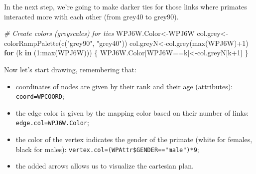 \documentclass[
  notitlepage,
  onecolumn,
  openany]{book}
\newenvironment{Shaded}{\begin{snugshade}}{\end{snugshade}}
\newcommand{\CommentTok}[1]{\textcolor[rgb]{0.56,0.35,0.01}{\textit{#1}}}
\newcommand{\ControlFlowTok}[1]{\textcolor[rgb]{0.13,0.29,0.53}{\textbf{#1}}}
\newcommand{\DecValTok}[1]{\textcolor[rgb]{0.00,0.00,0.81}{#1}}
\newcommand{\FunctionTok}[1]{\textcolor[rgb]{0.00,0.00,0.00}{#1}}
\newcommand{\NormalTok}[1]{#1}
\newcommand{\OtherTok}[1]{\textcolor[rgb]{0.56,0.35,0.01}{#1}}
\newcommand{\SpecialCharTok}[1]{\textcolor[rgb]{0.00,0.00,0.00}{#1}}
\newcommand{\StringTok}[1]{\textcolor[rgb]{0.31,0.60,0.02}{#1}}
\providecommand{\tightlist}{%
  \setlength{\itemsep}{0pt}\setlength{\parskip}{0pt}}
\begin{document}
In the next step, we're going to make darker ties for those links where primates interacted more with each other (from grey40 to grey90).

\begin{Shaded}
\begin{Highlighting}[]
\CommentTok{\# Create colors (greyscales) for ties}
\NormalTok{WPJ6W.Color}\OtherTok{\textless{}{-}}\NormalTok{WPJ6W}
\NormalTok{col.grey}\OtherTok{\textless{}{-}}\FunctionTok{colorRampPalette}\NormalTok{(}\FunctionTok{c}\NormalTok{(}\StringTok{"grey90"}\NormalTok{, }\StringTok{"grey40"}\NormalTok{))}
\NormalTok{col.greyN}\OtherTok{\textless{}{-}}\FunctionTok{col.grey}\NormalTok{(}\FunctionTok{max}\NormalTok{(WPJ6W)}\SpecialCharTok{+}\DecValTok{1}\NormalTok{)}
\ControlFlowTok{for}\NormalTok{ (k }\ControlFlowTok{in}\NormalTok{ (}\DecValTok{1}\SpecialCharTok{:}\FunctionTok{max}\NormalTok{(WPJ6W)))}
\NormalTok{\{}
\NormalTok{    WPJ6W.Color[WPJ6W}\SpecialCharTok{==}\NormalTok{k]}\OtherTok{\textless{}{-}}\NormalTok{col.greyN[k}\SpecialCharTok{+}\DecValTok{1}\NormalTok{]}
\NormalTok{\}}
\end{Highlighting}
\end{Shaded}

Now let's start drawing, remembering that:

\begin{itemize}
\tightlist
\item
  coordinates of nodes are given by their rank and their age (attributes): \texttt{coord=WPCOORD};
\item
  the edge color is given by the mapping color based on their number of links: \texttt{edge.col=WPJ6W.Color};
\item
  the color of the vertex indicates the gender of the primate (white for females, black for males): \texttt{vertex.col=(WPAttr\$GENDER=="male")*9};
\item
  the added arrows allows us to visualize the cartesian plan.
\end{itemize}
\end{document}
